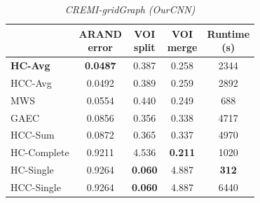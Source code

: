 \begin{table}[t]
        \centering
    \tiny
        \begin{subtable}[t]{0.29\textwidth}
        \centering
        \begin{tabular}[t]{lcccc}
        \toprule
          & \makecell{ARAND\\error} & \makecell{VOI\\split} & \makecell{VOI\\merge}&  \makecell{Runtime\\(s)} \\ \midrule 
\textbf{HC-Avg} & \textbf{0.0487} & 0.387 & 0.258 & 2344 \\
HCC-Avg & 0.0492 & 0.389 & 0.259 & 2892 \\
MWS \cite{wolf2018mutex} & 0.0554 & 0.440 & 0.249 & 688 \\
GAEC \cite{keuper2015efficient} & 0.0856 & 0.356 & 0.338 & 4717 \\
HCC-Sum & 0.0872 & 0.365 & 0.337 & 4970 \\
HC-Complete & 0.9211 & 4.536 & \textbf{0.211} & 1020 \\
HC-Single & 0.9264 & \textbf{0.060} & 4.887 & \textbf{312} \\
HCC-Single & 0.9264 & \textbf{0.060} & 4.887 & 6440 \\
        \end{tabular}
        \vspace*{1em}
    \caption{\emph{CREMI-gridGraph (OurCNN)}}
    \label{tab:scores_gridGraph}

\end{subtable}
\end{table}
